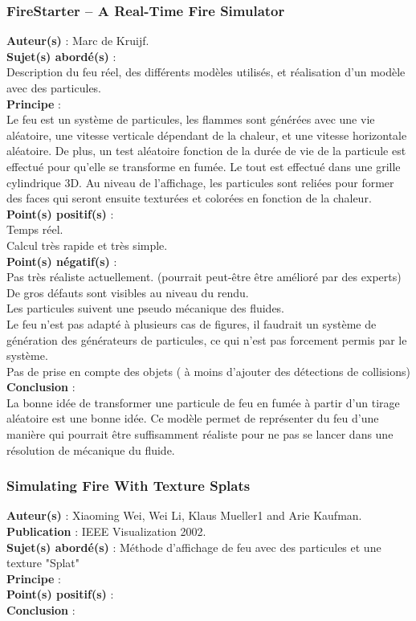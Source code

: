 \documentclass[a4paper,10pt]{article}
\begin{document}
\subsubsection{FireStarter – A Real-Time Fire Simulator}
\textbf{Auteur(s)} : Marc de Kruijf.\\
\textbf{Sujet(s) abordé(s)} : \\ 
	Description du feu réel, des différents modèles utilisés, et réalisation d'un modèle avec des particules.\\
\textbf{Principe} :\\	
	Le feu est un système de particules, les flammes sont générées avec une vie aléatoire, une vitesse verticale dépendant de la chaleur, et une vitesse horizontale aléatoire. De plus, un test aléatoire fonction de la durée de vie de la particule est effectué pour qu'elle se transforme en fumée. Le tout est effectué dans une grille cylindrique 3D. Au niveau de l'affichage, les particules sont reliées pour former des faces qui seront ensuite texturées et colorées en fonction de la chaleur.\\
\textbf{Point(s) positif(s)} :\\
	Temps réel.\\
	Calcul très rapide et très simple.\\
\textbf{Point(s) négatif(s)} :\\
	Pas très réaliste actuellement. (pourrait peut-être être amélioré par des experts)\\
	De gros défauts sont visibles au niveau du rendu.\\
	Les particules suivent une pseudo mécanique des fluides.\\
	Le feu n'est pas adapté à plusieurs cas de figures, il faudrait un système de génération des générateurs de particules, ce qui n'est pas forcement permis par le système.\\
	Pas de prise en compte des objets ( à moins d'ajouter des détections de collisions)\\
\textbf{Conclusion} :\\
	La bonne idée de transformer une particule de feu en fumée à partir d'un tirage aléatoire est une bonne idée. Ce modèle permet de représenter du feu d'une manière qui pourrait être suffisamment réaliste pour ne pas se lancer dans une résolution de mécanique du fluide.\\


\subsubsection{Simulating Fire With Texture Splats}
\textbf{Auteur(s)} : Xiaoming Wei, Wei Li, Klaus Mueller1 and Arie Kaufman.\\
\textbf{Publication} : IEEE Visualization 2002. \\
\textbf{Sujet(s) abordé(s)} : Méthode d'affichage de feu avec des particules et une texture "Splat"\\ 
\textbf{Principe} :\\	
\textbf{Point(s) positif(s)} :\\
\textbf{Conclusion} :\\
\end{document}

